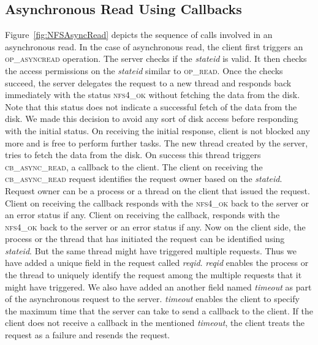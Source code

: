 \subsection{Asynchronous Read Using Callbacks}
Figure~\ref{fig:NFSAsyncRead} depicts the sequence of calls involved in an asynchronous read. In the case of asynchronous read, the client first triggers an \textsc{op\_asyncread} operation. The server checks if the \textit{stateid} is valid. It then checks the access permissions on the \textit{stateid} similar to \textsc{op\_read}. Once the checks succeed, the server delegates the request to a new thread and responds back immediately with the status \textsc{nfs4\_ok} without fetching the data from the disk.  Note that this status does not indicate a successful fetch of the data from the disk. We made this decision to avoid any sort of disk access before responding with the initial status. On receiving the initial response, client is not blocked any more and is free to perform further tasks. The new thread created by the server, tries to fetch the data from the disk. On success this thread triggers  \textsc{cb\_async\_read}, a callback to the client. The client on receiving the \textsc{cb\_async\_read} request identifies the request owner based on the \textit{stateid}. Request owner can  be a process or a thread on the client that issued the request. Client on receiving the callback responds with the \textsc{nfs4\_ok} back to the server or an error status if any.  Client on receiving the callback, responds with the \textsc{nfs4\_ok} back to the server or an error status if any. Now on the client side, the process or the thread that has initiated the request can be identified using \textit{stateid}. But the same thread might have triggered multiple requests. Thus we have added a unique field in the request called \textit{reqid}.  \textit{reqid} enables the process or the thread to uniquely identify the request among the multiple requests that it might have triggered. We also have added an another field named  \textit{timeout} as part of  the asynchronous request to the server. \textit{timeout} enables the client to specify the maximum time that the server can take to send a callback to the client. If the client does not receive a callback in the mentioned  \textit{timeout}, the client treats the request as a failure and resends the request.

